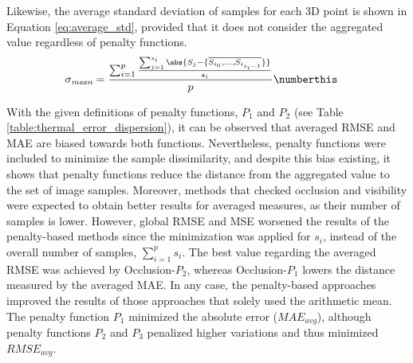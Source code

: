 Likewise, the average standard deviation of samples for each 3D point is shown in Equation \ref{eq:average_std}, provided that it does not consider the aggregated value regardless of penalty functions. 
\begin{align*}
    &\sigma_{\textit{mean}} = \frac{\sum_{i=1}^{p} \frac{\sum_{j=1}^{s_i} \abs{S_j - \{\overline{S_{i_0},...,S_{i_{s_i-1}}}\}}}{s_i}}{p} 
    \numberthis \label{eq:average_std}
\end{align*}

With the given definitions of penalty functions, $P_1$ and $P_2$ (see Table \ref{table:thermal_error_dispersion}), it can be observed that averaged RMSE and MAE are biased towards both functions. Nevertheless, penalty functions were included to minimize the sample dissimilarity, and despite this bias existing, it shows that penalty functions reduce the distance from the aggregated value to the set of image samples. Moreover, methods that checked occlusion and visibility were expected to obtain better results for averaged measures, as their number of samples is lower. However, global RMSE and MSE worsened the results of the penalty-based methods since the minimization was applied for $s_i$, instead of the overall number of samples, $\sum_{i=1}^{p} s_i$. The best value regarding the averaged RMSE was achieved by Occlusion-$P_2$, whereas Occlusion-$P_1$ lowers the distance measured by the averaged MAE. In any case, the penalty-based approaches improved the results of those approaches that solely used the arithmetic mean. The penalty function $P_1$ minimized the absolute error ($\textit{MAE}_{\textit{avg}}$), although penalty functions $P_2$ and $P_3$ penalized higher variations and thus minimized $\textit{RMSE}_{\textit{avg}}$.

